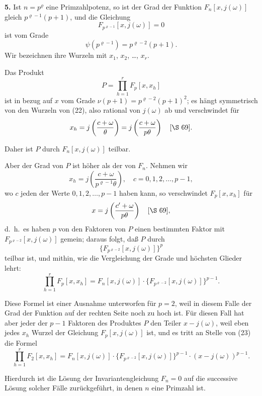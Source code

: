\documentclass[12pt,a4paper]{article}
\theoremstyle{definition}
\begin{document}
\textbf{5.} Ist $n = p^\varrho$ eine Primzahlpotenz, so ist der Grad der Funktion $F_n[x, j(\omega)]$ gleich $p^{\varrho-1}(p+1)$, und die Gleichung
\begin{equation}\label{eq:69-22}
F_{p^{\varrho-1}}[x, j(\omega)] = 0
\end{equation}
ist vom Grade
\[
\psi(p^{\varrho-1}) = p^{\varrho-2}(p+1).
\]
Wir bezeichnen ihre Wurzeln mit $x_1$, $x_2$, \ldots, $x_r$.

Das Produkt
\[
P = \prod_{h=1}^{r} F_p[x, x_h]
\]
ist in bezug auf $x$ vom Grade $\nu(p+1) = p^{\varrho-2}(p+1)^2$; es hängt symmetrisch von den Wurzeln von (22), also rational von $j(\omega)$ ab und verschwindet für
\[
x_h = j\left(\frac{c + \omega}{\theta}\right) = j\left(\frac{c + \omega}{p\theta}\right) \quad [\S\ 69].
\]

Daher ist $P$ durch $F_n[x, j(\omega)]$ teilbar.

Aber der Grad von $P$ ist höher als der von $F_n$. Nehmen wir
\[
x_h = j\left(\frac{c + \omega}{p^{\varrho-1}\theta}\right), \quad c = 0, 1, 2, \ldots, p-1,
\]
wo $c$ jeden der Werte $0, 1, 2, \ldots, p-1$ haben kann, so verschwindet $F_p[x, x_h]$ für
\[
x = j\left(\frac{c' + \omega}{p\theta}\right) \quad [\S\ 69],
\]
d.~h.\ es haben $p$ von den Faktoren von $P$ einen bestimmten Faktor mit $F_{p^{\varrho-2}}[x, j(\omega)]$ gemein; daraus folgt, daß $P$ durch
\[
\{F_{p^{\varrho-2}}[x, j(\omega)]\}^p
\]
teilbar ist, und mithin, wie die Vergleichung der Grade und höchsten Glieder lehrt:
\begin{equation}\label{eq:69-23}
\prod_{h=1}^{r} F_p[x, x_h] = F_n[x, j(\omega)] \cdot \{F_{p^{\varrho-2}}[x, j(\omega)]\}^{p-1}.
\end{equation}

Diese Formel ist einer Ausnahme unterworfen für $p = 2$, weil in diesem Falle der Grad der Funktion auf der rechten Seite noch zu hoch ist. Für diesen Fall hat aber jeder der $p-1$ Faktoren des Produktes $P$ den Teiler $x - j(\omega)$, weil eben jedes $x_h$ Wurzel der Gleichung $F_p[x, j(\omega)]$ ist, und es tritt an Stelle von (23) die Formel
\begin{equation}\label{eq:69-24}
\prod_{h=1}^{r} F_2[x, x_h] = F_n[x, j(\omega)] \cdot \{F_{p^{\varrho-2}}[x, j(\omega)]\}^{p-1} \cdot (x - j(\omega))^{p-1}.
\end{equation}

Hierdurch ist die Lösung der Invariantengleichung $F_n = 0$ auf die successive Lösung solcher Fälle zurückgeführt, in denen $n$ eine Primzahl ist.
\end{document}
